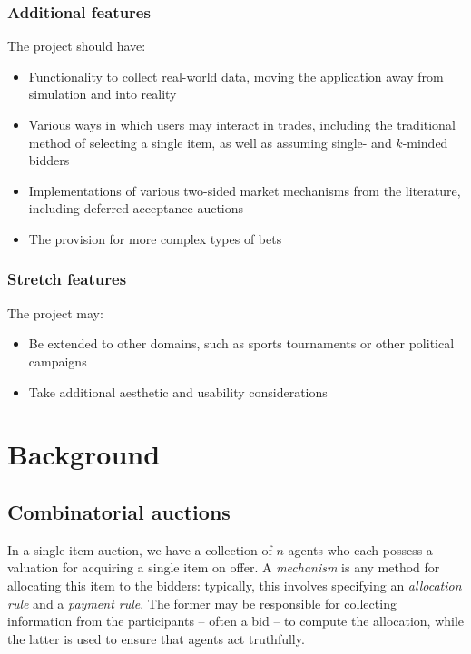 \documentclass[10pt,a4paper]{article}
\theoremstyle{plain}
\theoremstyle{definition}
\begin{document}
	\subsubsection{Additional features}

	The project should have:

	\begin{itemize}
		\itemsep0em
		\item Functionality to collect real-world data, moving the application
			away from simulation and into reality

		\item Various ways in which users may interact in trades, including
			the traditional method of selecting a single item, as well as
			assuming single- and $k$-minded bidders

		\item Implementations of various two-sided market mechanisms from the
			literature, including deferred acceptance auctions

		\item The provision for more complex types of bets
	\end{itemize}

	\subsubsection{Stretch features}

	The project may:

	\begin{itemize}
		\itemsep0em
		\item Be extended to other domains, such as sports tournaments or other
			political campaigns

		\item Take additional aesthetic and usability considerations
	\end{itemize}

\section{Background}
	\label{sec:background}

	\subsection{Combinatorial auctions}

	In a single-item auction, we have a collection of $n$ agents who each
	possess a valuation for acquiring a single item on offer. A
	\emph{mechanism} is any method for allocating this item to the bidders:
	typically, this involves specifying an \emph{allocation rule} and a
	\emph{payment rule}. The former may be responsible for collecting
	information from the participants -- often a bid -- to compute the
	allocation, while the latter is used to ensure that agents act truthfully.
\end{document}
